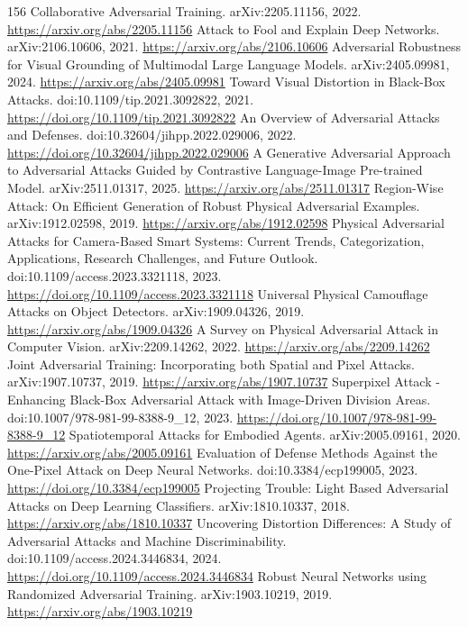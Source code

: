 \documentclass[11pt]{article}
\begin{document}
\begin{thebibliography}{156}
 Collaborative Adversarial Training. arXiv:2205.11156, 2022. \url{https://arxiv.org/abs/2205.11156}
 Attack to Fool and Explain Deep Networks. arXiv:2106.10606, 2021. \url{https://arxiv.org/abs/2106.10606}
 Adversarial Robustness for Visual Grounding of Multimodal Large Language Models. arXiv:2405.09981, 2024. \url{https://arxiv.org/abs/2405.09981}
 Toward Visual Distortion in Black-Box Attacks. doi:10.1109/tip.2021.3092822, 2021. \url{https://doi.org/10.1109/tip.2021.3092822}
 An Overview of Adversarial Attacks and Defenses. doi:10.32604/jihpp.2022.029006, 2022. \url{https://doi.org/10.32604/jihpp.2022.029006}
 A Generative Adversarial Approach to Adversarial Attacks Guided by Contrastive Language-Image Pre-trained Model. arXiv:2511.01317, 2025. \url{https://arxiv.org/abs/2511.01317}
 Region-Wise Attack: On Efficient Generation of Robust Physical Adversarial Examples. arXiv:1912.02598, 2019. \url{https://arxiv.org/abs/1912.02598}
 Physical Adversarial Attacks for Camera-Based Smart Systems: Current Trends, Categorization, Applications, Research Challenges, and Future Outlook. doi:10.1109/access.2023.3321118, 2023. \url{https://doi.org/10.1109/access.2023.3321118}
 Universal Physical Camouflage Attacks on Object Detectors. arXiv:1909.04326, 2019. \url{https://arxiv.org/abs/1909.04326}
 A Survey on Physical Adversarial Attack in Computer Vision. arXiv:2209.14262, 2022. \url{https://arxiv.org/abs/2209.14262}
 Joint Adversarial Training: Incorporating both Spatial and Pixel Attacks. arXiv:1907.10737, 2019. \url{https://arxiv.org/abs/1907.10737}
 Superpixel Attack - Enhancing Black-Box Adversarial Attack with Image-Driven Division Areas. doi:10.1007/978-981-99-8388-9\_12, 2023. \url{https://doi.org/10.1007/978-981-99-8388-9_12}
 Spatiotemporal Attacks for Embodied Agents. arXiv:2005.09161, 2020. \url{https://arxiv.org/abs/2005.09161}
 Evaluation of Defense Methods Against the One-Pixel Attack on Deep Neural Networks. doi:10.3384/ecp199005, 2023. \url{https://doi.org/10.3384/ecp199005}
 Projecting Trouble: Light Based Adversarial Attacks on Deep Learning Classifiers. arXiv:1810.10337, 2018. \url{https://arxiv.org/abs/1810.10337}
 Uncovering Distortion Differences: A Study of Adversarial Attacks and Machine Discriminability. doi:10.1109/access.2024.3446834, 2024. \url{https://doi.org/10.1109/access.2024.3446834}
 Robust Neural Networks using Randomized Adversarial Training. arXiv:1903.10219, 2019. \url{https://arxiv.org/abs/1903.10219}

\end{thebibliography}
\end{document}
